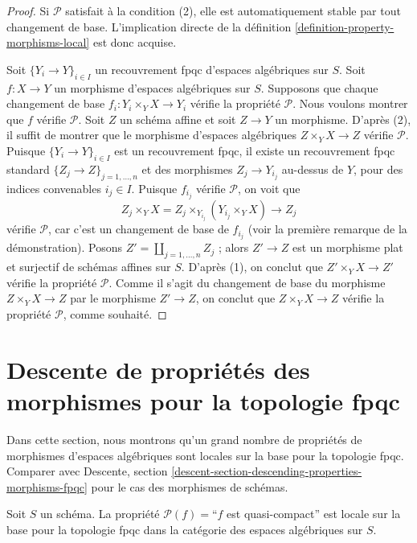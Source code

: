 \begin{proof}
Si $\mathcal{P}$ satisfait à la condition (2), elle est automatiquement
stable par tout changement de base. L'implication directe de la
définition \ref{definition-property-morphisms-local} est donc acquise.

\medskip\noindent
Soit $\{Y_i \to Y\}_{i \in I}$ un recouvrement fpqc d'espaces algébriques sur $S$.
Soit $f : X \to Y$ un morphisme d'espaces algébriques sur $S$.
Supposons que chaque changement de base $f_i : Y_i \times_Y X \to Y_i$ vérifie la propriété
$\mathcal{P}$. Nous voulons montrer que $f$ vérifie $\mathcal{P}$.
Soit $Z$ un schéma affine et soit $Z \to Y$ un morphisme.
D'après (2), il suffit de montrer que le morphisme d'espaces algébriques
$Z \times_Y X \to Z$ vérifie $\mathcal{P}$.
Puisque $\{Y_i \to Y\}_{i \in I}$ est un recouvrement fpqc, il existe
un recouvrement fpqc standard $\{Z_j \to Z\}_{j = 1, \ldots , n}$
et des morphismes $Z_j \to Y_{i_j}$ au-dessus de $Y$, pour des indices convenables $i_j \in I$.
Puisque $f_{i_j}$ vérifie $\mathcal{P}$, on voit que
$$
Z_j \times_Y X
=
Z_j \times_{Y_{i_j}} (Y_{i_j} \times_Y X)
\longrightarrow
Z_j
$$
vérifie $\mathcal{P}$, car c'est un changement de base de $f_{i_j}$ (voir la première remarque de la
démonstration). Posons $Z' = \coprod_{j = 1, \ldots, n} Z_j$ ; alors $Z' \to Z$ est
un morphisme plat et surjectif de schémas affines sur $S$. D'après (1),
on conclut que $Z' \times_Y X \to Z'$ vérifie la propriété $\mathcal{P}$.
Comme il s'agit du changement de base du morphisme $Z \times_Y X \to Z$
par le morphisme $Z' \to Z$, on conclut que
$Z \times_Y X \to Z$ vérifie la propriété $\mathcal{P}$, comme souhaité.
\end{proof}
	
	
\section{Descente de propriétés des morphismes pour la topologie fpqc}
\label{section-descending-properties-morphisms-fpqc}


\noindent
Dans cette section, nous montrons qu'un grand nombre de propriétés
de morphismes d'espaces algébriques sont locales sur la base
pour la topologie fpqc. Comparer avec
Descente, section \ref{descent-section-descending-properties-morphisms-fpqc}
pour le cas des morphismes de schémas.

\begin{lemma}
\label{lemma-descending-property-quasi-compact}
Soit $S$ un schéma.
La propriété $\mathcal{P}(f) =$``$f$ est quasi-compact''
est locale sur la base pour la topologie fpqc dans la catégorie des espaces algébriques sur $S$.
\end{lemma}

